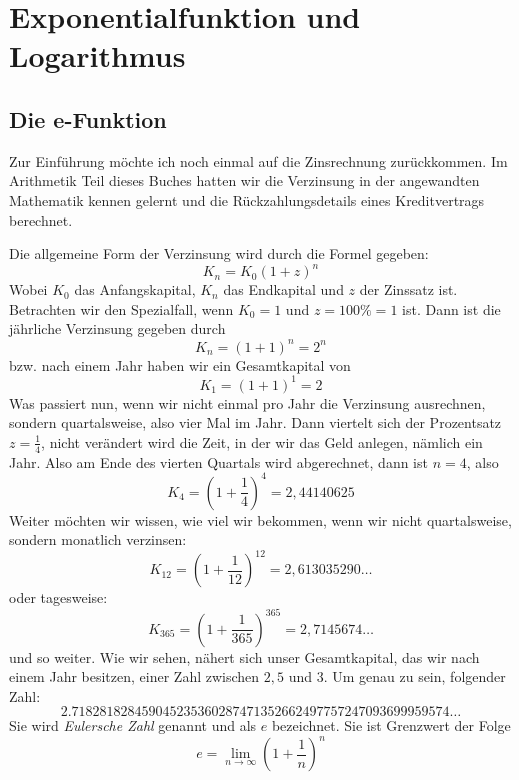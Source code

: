 
\chapter{Exponentialfunktion und Logarithmus}

\section{Die e-Funktion}

Zur Einführung möchte ich noch einmal auf die Zinsrechnung zurückkommen. Im Arithmetik Teil dieses Buches hatten wir die Verzinsung in der angewandten Mathematik kennen gelernt und die Rückzahlungsdetails eines Kreditvertrags berechnet. 

Die allgemeine Form der Verzinsung wird durch die Formel gegeben:
\begin{equation}
K_n = K_0 (1+z)^n
\end{equation}
Wobei $K_0$ das Anfangskapital, $K_n$ das Endkapital und $z$ der Zinssatz ist. Betrachten wir den Spezialfall, wenn $K_0 = 1$ und $z=100\% = 1$ ist. Dann ist die jährliche Verzinsung gegeben durch
\begin{equation}
K_n = (1+1)^n = 2^n
\end{equation}
bzw. nach einem Jahr haben wir ein Gesamtkapital von
\begin{equation}
K_1 = (1+1)^1 = 2
\end{equation}
Was passiert nun, wenn wir nicht einmal pro Jahr die Verzinsung ausrechnen, sondern quartalsweise, also vier Mal im Jahr. Dann viertelt sich der Prozentsatz $z=\frac{1}{4}$, nicht verändert wird die Zeit, in der wir das Geld anlegen, nämlich ein Jahr. Also am Ende des vierten Quartals wird abgerechnet, dann ist $n=4$, also
\begin{equation}
K_4 = \left(1+\frac{1}{4} \right)^4 = 2,44140625
\end{equation}
Weiter möchten wir wissen, wie viel wir bekommen, wenn wir nicht quartalsweise, sondern monatlich verzinsen:
\begin{equation}
K_{12} = \left(1+\frac{1}{12} \right)^{12} = 2,613035290\dots
\end{equation}
oder tagesweise:
\begin{equation}
K_{365} = \left(1+\frac{1}{365} \right)^{365} = 2,7145674\dots
\end{equation}
und so weiter. Wie wir sehen, nähert sich unser Gesamtkapital, das wir nach einem Jahr besitzen, einer Zahl zwischen $2,5$ und $3$. Um genau zu sein, folgender Zahl:
\begin{equation}
2.718281828459045235360287471352662497757247093699959574\dots
\end{equation}
Sie wird \emph{Eulersche Zahl} genannt und als $e$ bezeichnet. Sie ist Grenzwert der Folge
\begin{equation}
e = \lim_{n\rightarrow \infty} \left( 1+\frac{1}{n} \right)^n
\end{equation}


